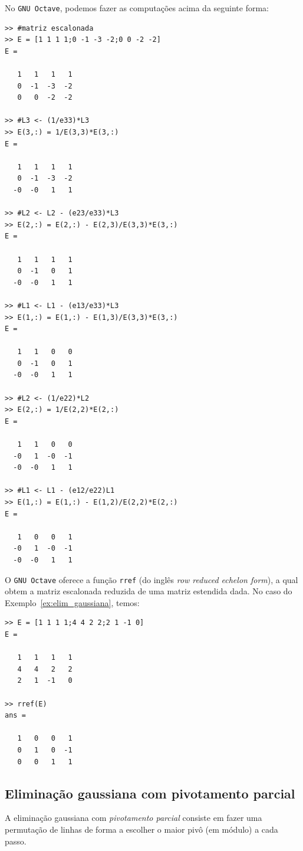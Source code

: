 \begin{ex}
\ifisoctave
No \verb+GNU Octave+, podemos fazer as computações acima da seguinte forma:
\begin{verbatim}
>> #matriz escalonada
>> E = [1 1 1 1;0 -1 -3 -2;0 0 -2 -2]
E =

   1   1   1   1
   0  -1  -3  -2
   0   0  -2  -2

>> #L3 <- (1/e33)*L3
>> E(3,:) = 1/E(3,3)*E(3,:)
E =

   1   1   1   1
   0  -1  -3  -2
  -0  -0   1   1

>> #L2 <- L2 - (e23/e33)*L3
>> E(2,:) = E(2,:) - E(2,3)/E(3,3)*E(3,:)
E =

   1   1   1   1
   0  -1   0   1
  -0  -0   1   1

>> #L1 <- L1 - (e13/e33)*L3
>> E(1,:) = E(1,:) - E(1,3)/E(3,3)*E(3,:)
E =

   1   1   0   0
   0  -1   0   1
  -0  -0   1   1

>> #L2 <- (1/e22)*L2
>> E(2,:) = 1/E(2,2)*E(2,:)
E =

   1   1   0   0
  -0   1  -0  -1
  -0  -0   1   1

>> #L1 <- L1 - (e12/e22)L1
>> E(1,:) = E(1,:) - E(1,2)/E(2,2)*E(2,:)
E =

   1   0   0   1
  -0   1  -0  -1
  -0  -0   1   1
\end{verbatim}
\fi
\end{ex}

\ifisoctave
\begin{obs}
O \verb+GNU Octave+ oferece a função \verb+rref+ (do inglês {\it row reduced echelon form}), a qual obtem a matriz escalonada reduzida de uma matriz estendida dada. No caso do Exemplo~\ref{ex:elim_gaussiana}, temos:
\begin{verbatim}
>> E = [1 1 1 1;4 4 2 2;2 1 -1 0]
E =

   1   1   1   1
   4   4   2   2
   2   1  -1   0

>> rref(E)
ans =

   1   0   0   1
   0   1   0  -1
   0   0   1   1
\end{verbatim}
\end{obs}
\fi


\subsection{Eliminação gaussiana com pivotamento parcial}
A eliminação gaussiana com \emph{pivotamento parcial} consiste em fazer uma permutação de linhas de forma a escolher o maior pivô (em módulo) a cada passo.

